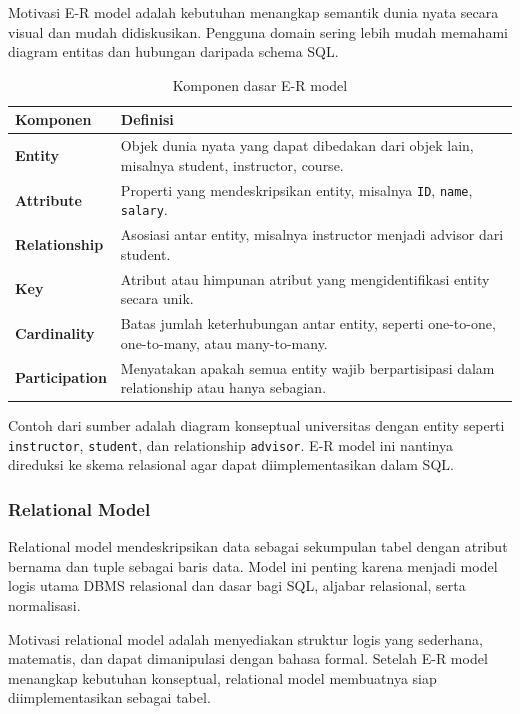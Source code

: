 Motivasi E-R model adalah kebutuhan menangkap semantik dunia nyata secara visual dan mudah didiskusikan. Pengguna domain sering lebih mudah memahami diagram entitas dan hubungan daripada schema SQL.

\begin{table}[H]
\centering
\begin{tabularx}{\textwidth}{|L{0.24\textwidth}|X|}
\hline
\textbf{Komponen} & \textbf{Definisi} \\
\hline
\textbf{Entity} & Objek dunia nyata yang dapat dibedakan dari objek lain, misalnya student, instructor, course. \\
\hline
\textbf{Attribute} & Properti yang mendeskripsikan entity, misalnya \texttt{ID}, \texttt{name}, \texttt{salary}. \\
\hline
\textbf{Relationship} & Asosiasi antar entity, misalnya instructor menjadi advisor dari student. \\
\hline
\textbf{Key} & Atribut atau himpunan atribut yang mengidentifikasi entity secara unik. \\
\hline
\textbf{Cardinality} & Batas jumlah keterhubungan antar entity, seperti one-to-one, one-to-many, atau many-to-many. \\
\hline
\textbf{Participation} & Menyatakan apakah semua entity wajib berpartisipasi dalam relationship atau hanya sebagian. \\
\hline
\end{tabularx}
\caption{Komponen dasar E-R model}
\label{tab:er-basic-modeldata}
\end{table}

Contoh dari sumber adalah diagram konseptual universitas dengan entity seperti \texttt{instructor}, \texttt{student}, dan relationship \texttt{advisor}. E-R model ini nantinya direduksi ke skema relasional agar dapat diimplementasikan dalam SQL.

\subsubsection{Relational Model}

\begin{jawab}
Relational model mendeskripsikan data sebagai sekumpulan tabel dengan atribut bernama dan tuple sebagai baris data. Model ini penting karena menjadi model logis utama DBMS relasional dan dasar bagi SQL, aljabar relasional, serta normalisasi.
\end{jawab}

Motivasi relational model adalah menyediakan struktur logis yang sederhana, matematis, dan dapat dimanipulasi dengan bahasa formal. Setelah E-R model menangkap kebutuhan konseptual, relational model membuatnya siap diimplementasikan sebagai tabel.

